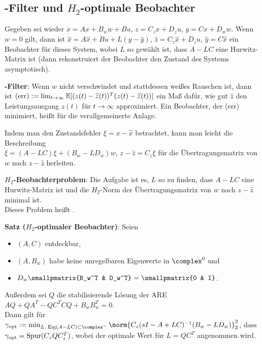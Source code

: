 \pagebreak

\subsection{%
    -Filter und \texorpdfstring{$H_2$-optimale}{H₂-optimale} Beobachter%
}

Gegeben sei wieder $\dot{x} = Ax + B_w w + Bu$,
$z = C_z x + D_z u$, $y = Cx + D_w w$.
Wenn $w = 0$ gilt, dann ist
$\dot{\widehat{x}} = A\widehat{x} + Bu + L(y - \widehat{y})$,
$\widehat{z} = C_z \widehat{x} + D_z u$,
$\widehat{y} = C\widehat{x}$
ein Beobachter für dieses System, wobei $L$ so gewählt ist, dass $A - LC$ eine Hurwitz-Matrix ist
(dann rekonstruiert der Beobachter den Zustand des Systems asymptotisch).

\textbf{-Filter}:
Wenn $w$ nicht verschwindet und stattdessen weißes Rauschen ist, dann ist
$\text{(err)} := \lim_{t \to \infty} \mathbb{E}[(z(t) - \widehat{z}(t))^T (z(t) - \widehat{z}(t))]$
ein Maß dafür, wie gut $\widehat{z}$ den Leistungsausgang $z(t)$ für $t \to \infty$ approximiert.
Ein Beobachter, der (err) minimiert, heißt  für die
verallgemeinerte Anlage.

Indem man den Zustandsfehler $\xi = x - \widehat{x}$ betrachtet, kann man leicht die Beschreibung\\
$\dot{\xi} = (A - LC)\xi + (B_w - LD_w) w$,
$z - \widehat{z} = C_z \xi$
für die Übertragungsmatrix von $w$ nach $z - \widehat{z}$ herleiten.

\textbf{$H_2$-Beobachterproblem}:
Die Aufgabe ist es, $L$ so zu finden, dass
$A - LC$ eine Hurwitz-Matrix ist und die $H_2$-Norm der Übertragungsmatrix von $w$ nach
$z - \widehat{z}$ minimal ist.\\
Dieses Problem heißt .

\linie

\textbf{Satz ($H_2$-optimaler Beobachter)}:
Seien
\begin{itemize}
    \item
    $(A, C)$ entdeckbar,

    \item
    $(A, B_w)$ habe keine unregelbaren Eigenwerte in $\complex^0$ und

    \item
    $D_w \smallpmatrix{B_w^T & D_w^T} = \smallpmatrix{0 & I}$.
\end{itemize}
Außerdem sei $Q$ die stabilisierende Lösung der ARE $AQ + QA^T - QC^T CQ + B_w B_w^T = 0$.\\
Dann gilt für
$\gamma_\opt := \min_{L,\;\Eig(A-LC)\subset\complex^-}
\norm{C_z (sI - A + LC)^{-1} (B_w - LD_w)}_2^2$, dass\\
$\gamma_{\text{opt}} = \operatorname{Spur}(C_z Q C_z^T)$, wobei der optimale Wert für $L = QC^T$ angenommen wird.

